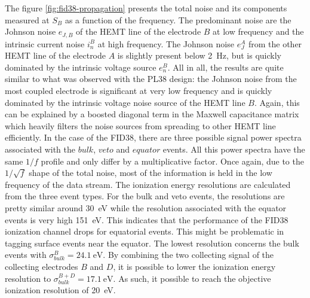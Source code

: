 The figure \ref{fig:fid38-propagation} presents the total noise and its components measured at $S_B$ as a function of the frequency. The predominant noise are the Johnson noise $e_{J,B}$ of the HEMT line of the electrode $B$ at low frequency and the intrinsic current noise $i_n^B$ at high frequency. The Johnson noise $e_J^A$ from the other HEMT line of the electrode $A$ is slightly present below \SI{2}{\Hz}, but is quickly dominated by the intrinsic voltage source $e_n^B$. All in all, the results are quite similar to what was observed with the PL38 design: the Johnson noise from the most coupled electrode is significant at very low frequency and is quickly dominated by the intrinsic voltage noise source of the HEMT line $B$. Again, this can be explained by a boosted diagonal term in the Maxwell capacitance matrix which heavily filters the noise sources from spreading to other HEMT line efficiently.
In the case of the FID38, there are three possible signal power spectra associated with the $bulk$, $veto$ and $equator$ events. All this power spectra have the same $1/f$ profile and only differ by a multiplicative factor.
Once again, due to the $1/\sqrt{f}$ shape of the total noise, most of the information is held in the low frequency of the data stream. The ionization energy resolutions are calculated from the three event types. For the bulk and veto events, the resolutions are pretty similar around \SI{30}{\eV} while the resolution associated with the equator events is very high \SI{151}{\eV}. This indicates that the performance of the FID38 ionization channel drops for equatorial events. This might be problematic in tagging surface events near the equator. The lowest resolution concerns the bulk events with $\sigma_{bulk}^B = \SI{24.1}{\eV}$. By combining the two collecting signal of the collecting electrodes $B$ and $D$, it is possible to lower the ionization energy resolution to  $\sigma_{bulk}^{B+D} = \SI{17.1}{\eV}$. As such, it possible to reach the objective ionization resolution of \SI{20}{\eV}.

